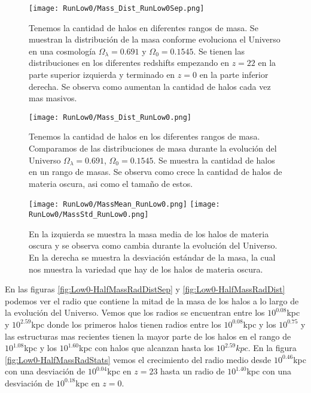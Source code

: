 \begin{figure}[H]
    \centering
    \texttt{[image: RunLow0/Mass\_Dist\_RunLow0Sep.png]}
    \caption[Distribución de masa en la evolución de un Universo $\Omega_\lambda = 0.691$, $\Omega_0 = 0.1545$]{\footnotesize Tenemos la cantidad de halos en diferentes rangos de masa. Se muestran la distribución de la masa conforme evoluciona el Universo en una cosmología $\Omega_\lambda = 0.691$ y $\Omega_0 = 0.1545$. Se tienen las distribuciones en los diferentes redshifts empezando en $z=22$ en la parte superior izquierda y terminado en $z=0$ en la parte inferior derecha. Se observa como aumentan la cantidad de halos cada vez mas masivos.}
    \label{fig:Low0-MassDistSep}
\end{figure}

\begin{figure}[H]
    \centering
    \texttt{[image: RunLow0/Mass\_Dist\_RunLow0.png]}
    \caption[Comparación de distribución de masa en un Universo $\Omega_\lambda = 0.691$, $\Omega_0 = 0.1545$]{\footnotesize Tenemos la cantidad de halos en los diferentes rangos de masa. Comparamos de las distribuciones de masa durante la evolución del Universo $\Omega_\lambda = 0.691$, $\Omega_0 = 0.1545$. Se muestra la cantidad de halos en un rango de masas. Se observa como crece la cantidad de halos de materia oscura, asi como el tamaño de estos.}
    \label{fig:Low0-MassDist}
\end{figure}

\begin{figure}[H]
    \centering
    \texttt{[image: RunLow0/MassMean\_RunLow0.png]}
    \texttt{[image: RunLow0/MassStd\_RunLow0.png]}
    \caption[Media y desviación estándar de la distribución de masa de un Universo $\Omega_\lambda = 0.691$, $\Omega_0 = 0.1545$]{\footnotesize En la izquierda se muestra la masa media de los halos de materia oscura y se observa como cambia durante la evolución del Universo. En la derecha se muestra la desviación estándar de la masa, la cual nos muestra la variedad que hay de los halos de materia oscura.}
    \label{fig:Low0-MassStats}
\end{figure}

En las figuras \ref{fig:Low0-HalfMassRadDistSep} y \ref{fig:Low0-HalfMassRadDist} podemos ver el radio que contiene la mitad de la masa de los halos a lo largo de la evolución del Universo. Vemos que los radios se encuentran entre los $10^{0.08}$kpc y $10^{2.59}$kpc donde los primeros halos tienen radios entre los $10^{0.08}$kpc y los $10^{0.75}$ y las estructuras mas recientes tienen la mayor parte de los halos en el rango de $10^{1.08}$kpc y los $10^{1.60}$kpc con halos que alcanzan hasta los $10^{2.59}kpc$. En la figura \ref{fig:Low0-HalfMassRadStats} vemos el crecimiento del radio medio desde $10^{0.46}$kpc con una desviación de $10^{0.04}$kpc en $z=23$ hasta un radio de $10^{1.40}$kpc con una desviación de $10^{0.18}$kpc en $z=0$.

